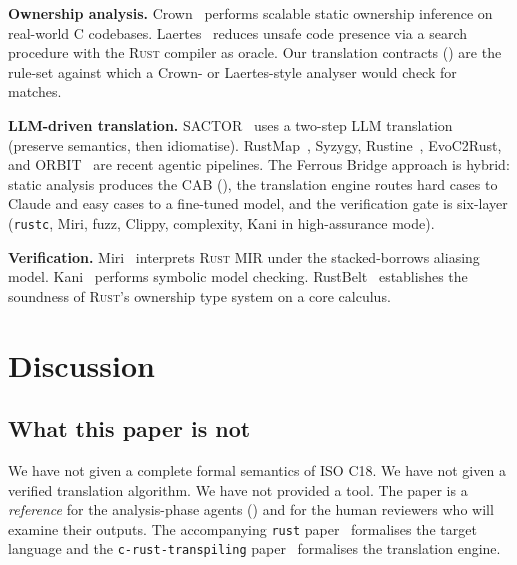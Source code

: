\documentclass[12pt]{article}
\newcommand{\rust}{\textnormal{\textsc{Rust}}}
\newcommand{\clang}{\textnormal{\textsc{C}}}
\theoremstyle{definition}
\theoremstyle{remark}
\begin{document}
\textbf{Ownership analysis.} Crown~\cite{zhang2023crown} performs scalable static ownership inference on real-world \clang{} codebases. Laertes~\cite{emre2023laertes} reduces unsafe code presence via a search procedure with the \rust{} compiler as oracle. Our translation contracts () are the rule-set against which a Crown- or Laertes-style analyser would check for matches.

\textbf{LLM-driven translation.} SACTOR~\cite{sactor2025} uses a two-step LLM translation (preserve semantics, then idiomatise). RustMap~\cite{rustmap2025}, Syzygy, Rustine~\cite{rustine2025}, EvoC2Rust, and ORBIT~\cite{orbit2026} are recent agentic pipelines. The Ferrous Bridge approach is hybrid: static analysis produces the CAB (), the translation engine routes hard cases to Claude and easy cases to a fine-tuned model, and the verification gate is six-layer (\texttt{rustc}, Miri, fuzz, Clippy, complexity, Kani in high-assurance mode).

\textbf{Verification.} Miri~\cite{jung2026miri} interprets \rust{} MIR under the stacked-borrows aliasing model. Kani~\cite{kani2024} performs symbolic model checking. RustBelt~\cite{jung2018rustbelt} establishes the soundness of \rust{}'s ownership type system on a core calculus.

\section{Discussion}
\label{sec:discussion}

\subsection{What this paper is not}
We have not given a complete formal semantics of ISO C18. We have not given a verified translation algorithm. We have not provided a tool. The paper is a \emph{reference} for the analysis-phase agents () and for the human reviewers who will examine their outputs. The accompanying \texttt{rust} paper~\cite{rustpaper} formalises the target language and the \texttt{c-rust-transpiling} paper~\cite{transpilingpaper} formalises the translation engine.
\end{document}
